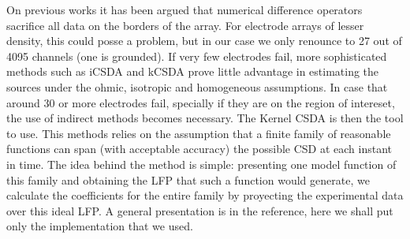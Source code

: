 \documentclass{article}
\begin{document}
On previous works it has been argued that numerical difference operators sacrifice all data on the borders of the array. For electrode arrays of lesser density, this could posse a problem, but in our case we only renounce to 27 out of 4095 channels (one is grounded).
If very few electrodes fail, more sophisticated methods such as iCSDA \cite{Leski2011} and kCSDA \cite{Potworowski2011} prove little advantage in estimating the sources under the ohmic, isotropic and homogeneous assumptions. In case that around 30 or more electrodes
fail, specially if they are on the region of intereset, the use of indirect methods
becomes necessary. The Kernel CSDA is then the tool to use. This methods relies on the
assumption that a finite family of reasonable functions can span (with acceptable accuracy) the possible CSD at each instant in time. The idea behind the method is simple:
presenting one model function of this family and obtaining the LFP that such a function
would generate, we calculate the coefficients for the entire family by proyecting the
experimental data over this ideal LFP. A general presentation is in the reference, here
we shall put only the implementation that we used.
\end{document}
